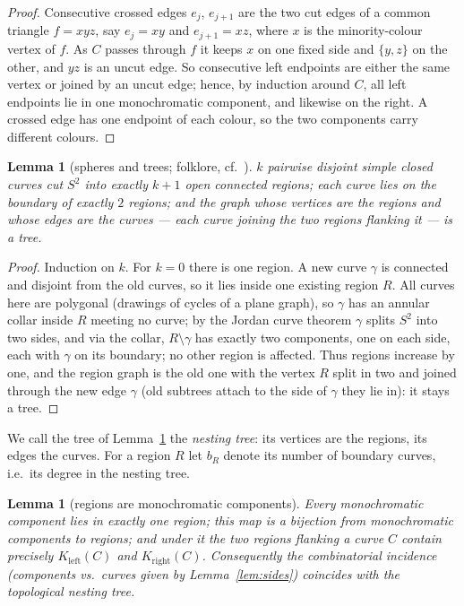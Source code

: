\documentclass[11pt]{article}
\newtheorem{lemma}[theorem]{Lemma}
\theoremstyle{remark}
\begin{document}
\begin{proof}
Consecutive crossed edges $e_j$, $e_{j+1}$ are the two cut edges of a
common triangle $f=xyz$, say $e_j=xy$ and $e_{j+1}=xz$, where $x$ is the
minority-colour vertex of $f$. As $C$ passes through $f$ it keeps $x$ on
one fixed side and $\{y,z\}$ on the other, and $yz$ is an uncut edge. So
consecutive left endpoints are either the same vertex or joined by an
uncut edge; hence, by induction around $C$, all left endpoints lie in one
monochromatic component, and likewise on the right. A crossed edge has
one endpoint of each colour, so the two components carry different
colours.
\end{proof}

\begin{lemma}[spheres and trees; folklore, cf.\ \cite{MT01}]
\label{lem:sphere}
$k$ pairwise disjoint simple closed curves cut $S^2$ into exactly $k+1$
open connected regions; each curve lies on the boundary of exactly $2$
regions; and the graph whose vertices are the regions and whose edges
are the curves --- each curve joining the two regions flanking it ---
is a tree.
\end{lemma}

\begin{proof}
Induction on $k$. For $k=0$ there is one region. A new curve $\gamma$ is
connected and disjoint from the old curves, so it lies inside one
existing region $R$. All curves here are polygonal (drawings of cycles of
a plane graph), so $\gamma$ has an annular collar inside $R$ meeting no
curve; by the Jordan curve theorem $\gamma$ splits $S^2$ into two sides,
and via the collar, $R\setminus\gamma$ has exactly two components, one on
each side, each with $\gamma$ on its boundary; no other region is
affected. Thus regions increase by one, and the region graph is the old
one with the vertex $R$ split in two and joined through the new edge
$\gamma$ (old subtrees attach to the side of $\gamma$ they lie in): it
stays a tree.
\end{proof}

We call the tree of Lemma~\ref{lem:sphere} the \emph{nesting tree}: its
vertices are the regions, its edges the curves. For a region $R$ let
$b_R$ denote its number of boundary curves, i.e.\ its degree in the
nesting tree.

\begin{lemma}[regions are monochromatic components]\label{lem:bij}
Every monochromatic component lies in exactly one region; this map is a
bijection from monochromatic components to regions; and under it the two
regions flanking a curve $C$ contain precisely $K_{\mathrm{left}}(C)$ and
$K_{\mathrm{right}}(C)$. Consequently the combinatorial incidence
(components vs.\ curves given by Lemma~\ref{lem:sides}) coincides with
the topological nesting tree.
\end{lemma}
\end{document}
